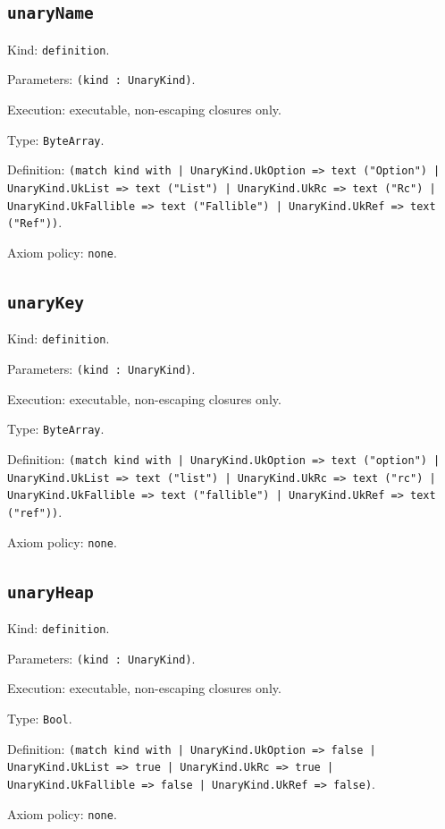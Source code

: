 \documentclass[11pt]{article}
\begin{document}
\subsection*{\texttt{unaryName}}
\noindent Kind: \texttt{definition}.\par
\noindent Parameters: \texttt{(kind : UnaryKind)}.\par
\noindent Execution: executable, non-escaping closures only.\par
\noindent Type: \texttt{ByteArray}.\par
\noindent Definition: \texttt{(match kind with | UnaryKind.UkOption => text ("Option") | UnaryKind.UkList => text ("List") | UnaryKind.UkRc => text ("Rc") | UnaryKind.UkFallible => text ("Fallible") | UnaryKind.UkRef => text ("Ref"))}.\par
\noindent Axiom policy: \texttt{none}.\par
\subsection*{\texttt{unaryKey}}
\noindent Kind: \texttt{definition}.\par
\noindent Parameters: \texttt{(kind : UnaryKind)}.\par
\noindent Execution: executable, non-escaping closures only.\par
\noindent Type: \texttt{ByteArray}.\par
\noindent Definition: \texttt{(match kind with | UnaryKind.UkOption => text ("option") | UnaryKind.UkList => text ("list") | UnaryKind.UkRc => text ("rc") | UnaryKind.UkFallible => text ("fallible") | UnaryKind.UkRef => text ("ref"))}.\par
\noindent Axiom policy: \texttt{none}.\par
\subsection*{\texttt{unaryHeap}}
\noindent Kind: \texttt{definition}.\par
\noindent Parameters: \texttt{(kind : UnaryKind)}.\par
\noindent Execution: executable, non-escaping closures only.\par
\noindent Type: \texttt{Bool}.\par
\noindent Definition: \texttt{(match kind with | UnaryKind.UkOption => false | UnaryKind.UkList => true | UnaryKind.UkRc => true | UnaryKind.UkFallible => false | UnaryKind.UkRef => false)}.\par
\noindent Axiom policy: \texttt{none}.\par
\end{document}
